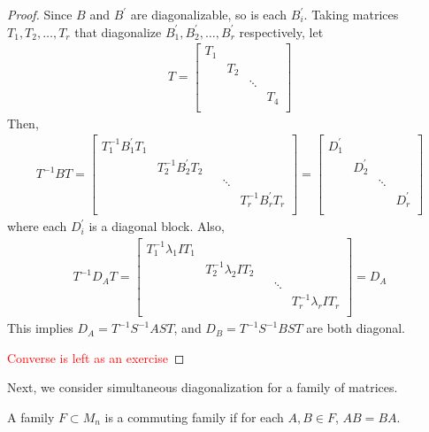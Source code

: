 \begin{proof}
  Since $B$ and $B^\prime$ are diagonalizable, so is each
  $B_i^\prime$. Taking matrices $T_1 , T_2 , \ldots , T_r$ that
  diagonalize $B^\prime_1 ,  B^\prime_2 , \ldots , B^\prime_r$
  respectively, let
  \begin{align*}
    T =
    \begin{bmatrix}%
      T_1&  &  &  \\
      & T_2 &  &  \\
      &  & \ddots &  \\
      &  &  & T_4 \\
    \end{bmatrix}
  \end{align*}
  Then,
  \begin{align*}
    T^{-1} B T =
    \begin{bmatrix}
      T_1^{-1}B_1^\prime T_1 &  &  & \\
      & T_2^{-1}B_2^\prime T_2 &   & \\
      &  &  & \ddots  & \\
      &  & &   & T_r^{-1} B_r^\prime T_r \\
    \end{bmatrix} =
    \begin{bmatrix}%
      D_1^\prime&  &  &  \\
      &  D_2^\prime&  &  \\
      &  &  \ddots&  \\
      &  &  & D_r^\prime \\
    \end{bmatrix}
  \end{align*} where each $D_i^\prime$ is a diagonal block.
  Also,
  \begin{align*}
    T^{-1} D_A T =
    \begin{bmatrix}
      T_1^{-1}\lambda_1 I T_1 &  &  & \\
      & T_2^{-1}\lambda_2 IT_2 &   & \\
      &  &  & \ddots  & \\
      &  & &   & T_r^{-1} \lambda_r I T_r \\
    \end{bmatrix} = D_A
  \end{align*}
  This implies $D_A = T^{-1} S^{-1} A S T$, and $D_B = T^{-1} S^{-1}
  B ST$ are both diagonal.

  \textcolor{red}{Converse is left as an exercise}
\end{proof}

Next, we consider simultaneous diagonalization for a family of matrices.
\begin{definition}
  A family $F \subset M_n$ is a commuting family if for each $A, B
  \in F$, $AB = BA$.
\end{definition}

